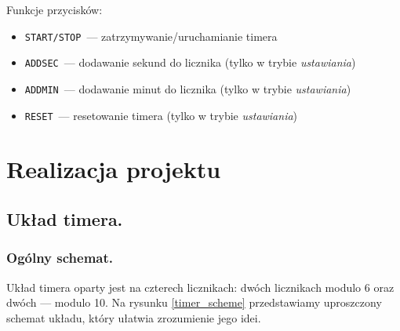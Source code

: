 \documentclass[a4paper,oneside]{report}
\newcommand{\startstop}{\texttt{START/STOP}}
\newcommand{\reset}{\texttt{RESET}}
\newcommand{\addmin}{\texttt{ADD\textunderscore MIN}}
\newcommand{\addsec}{\texttt{ADD\textunderscore SEC}}
\begin{document}
Funkcje przycisków:
\begin{itemize}
	\item \startstop\ --- zatrzymywanie/uruchamianie timera
	\item \addsec\ --- dodawanie sekund do licznika (tylko w trybie
		\emph{ustawiania})
	\item \addmin\ --- dodawanie minut do licznika (tylko w trybie
		\emph{ustawiania})
	\item \reset\ --- resetowanie timera (tylko w trybie
		\emph{ustawiania})
\end{itemize}

\chapter{Realizacja projektu}
\section{Układ timera.}
\subsection{Ogólny schemat.}
Układ timera oparty jest na czterech licznikach: dwóch licznikach
modulo 6 oraz dwóch --- modulo 10. Na rysunku \ref{timer_scheme}
przedstawiamy uproszczony schemat układu, który ułatwia zrozumienie
jego idei.
\end{document}
